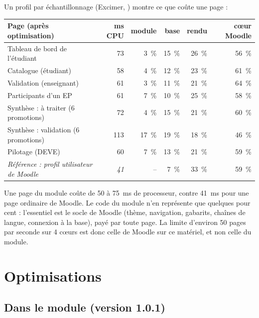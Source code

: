 \documentclass[11pt,a4paper]{article}
\newcommand{\code}[1]{\texttt{\detokenize{#1}}}
\begin{document}
Un profil par échantillonnage (Excimer, \code{profil.py}) montre ce que coûte une page :

\begin{center}
\begin{tabularx}{\linewidth}{@{}X r r r r r@{}}
\toprule
\textbf{Page (après optimisation)} & \textbf{ms CPU} & \textbf{module} & \textbf{base} & \textbf{rendu} &
  \textbf{c\oe ur Moodle} \\
\midrule
Tableau de bord de l'étudiant & 73 & 3~\% & 15~\% & 26~\% & 56~\% \\
Catalogue (étudiant) & 58 & 4~\% & 12~\% & 23~\% & 61~\% \\
Validation (enseignant) & 61 & 3~\% & 11~\% & 21~\% & 64~\% \\
Participants d'un EP & 61 & 7~\% & 10~\% & 25~\% & 58~\% \\
Synthèse : à traiter (6 promotions) & 72 & 4~\% & 15~\% & 21~\% & 60~\% \\
Synthèse : validation (6 promotions) & 113 & 17~\% & 19~\% & 18~\% & 46~\% \\
Pilotage (DEVE) & 60 & 7~\% & 13~\% & 21~\% & 59~\% \\
\emph{Référence : profil utilisateur de Moodle} & \emph{41} & -- & 7~\% & 33~\% & 59~\% \\
\bottomrule
\end{tabularx}
\end{center}

Une page du module coûte de 50 à 75~ms de processeur, contre 41~ms pour une page ordinaire de
Moodle. Le code du module n'en représente que quelques pour cent : l'essentiel est le socle de
Moodle (thème, navigation, gabarits, chaînes de langue, connexion à la base), payé par toute
page. La limite d'environ 50 pages par seconde sur 4 c\oe urs est donc celle de Moodle sur
ce matériel, et non celle du module.

\section{Optimisations}

\subsection{Dans le module (version 1.0.1)}
\end{document}
